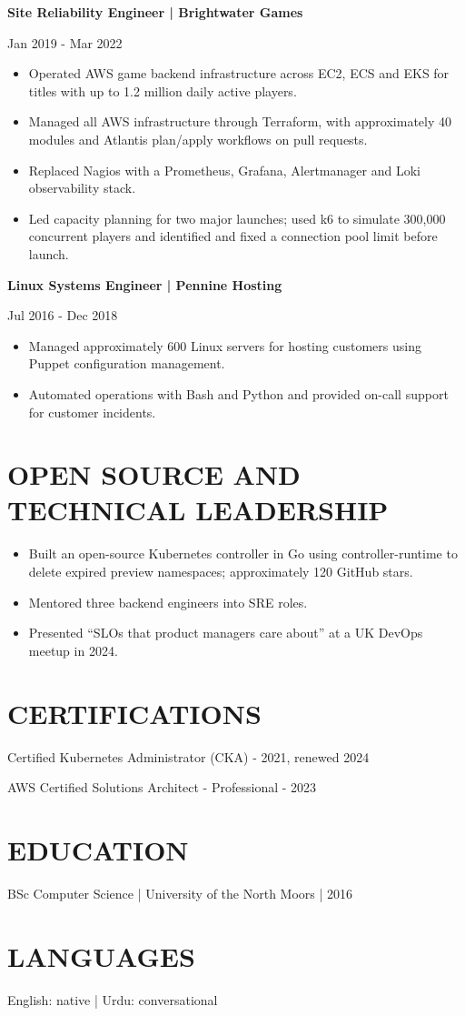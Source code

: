 \documentclass[11pt,a4paper]{article}
\newcommand{\cvsection}[1]{\section*{#1}}
\newcommand{\cvitem}[2]{\noindent\textbf{#1}\par\noindent #2\par}
\begin{document}
\cvitem{Site Reliability Engineer | Brightwater Games}{Jan 2019 - Mar 2022}
\begin{itemize}
\item Operated AWS game backend infrastructure across EC2, ECS and EKS for titles with up to 1.2 million daily active players.
\item Managed all AWS infrastructure through Terraform, with approximately 40 modules and Atlantis plan/apply workflows on pull requests.
\item Replaced Nagios with a Prometheus, Grafana, Alertmanager and Loki observability stack.
\item Led capacity planning for two major launches; used k6 to simulate 300,000 concurrent players and identified and fixed a connection pool limit before launch.
\end{itemize}

\cvitem{Linux Systems Engineer | Pennine Hosting}{Jul 2016 - Dec 2018}
\begin{itemize}
\item Managed approximately 600 Linux servers for hosting customers using Puppet configuration management.
\item Automated operations with Bash and Python and provided on-call support for customer incidents.
\end{itemize}

\cvsection{OPEN SOURCE AND TECHNICAL LEADERSHIP}
\begin{itemize}
\item Built an open-source Kubernetes controller in Go using controller-runtime to delete expired preview namespaces; approximately 120 GitHub stars.
\item Mentored three backend engineers into SRE roles.
\item Presented ``SLOs that product managers care about'' at a UK DevOps meetup in 2024.
\end{itemize}

\cvsection{CERTIFICATIONS}
Certified Kubernetes Administrator (CKA) - 2021, renewed 2024\par
AWS Certified Solutions Architect - Professional - 2023

\cvsection{EDUCATION}
BSc Computer Science | University of the North Moors | 2016

\cvsection{LANGUAGES}
English: native | Urdu: conversational
\end{document}
